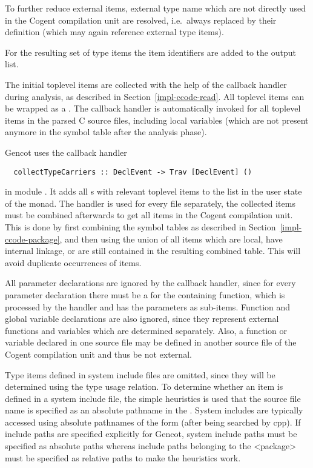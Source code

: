 To further reduce external items, external type name which are not directly used in the Cogent compilation unit are
resolved, i.e.~always replaced by their definition (which may again reference external type items).

For the resulting set of type items the item identifiers are added to the output list. 

The initial toplevel items are collected with the help of the callback handler during analysis, as described in 
Section~\ref{impl-ccode-read}. All toplevel items can be wrapped as a . The callback handler 
is automatically invoked for all toplevel items in the parsed
C source files, including local variables (which are not present anymore in the symbol table after the analysis phase).

Gencot uses the callback handler
\begin{verbatim}
  collectTypeCarriers :: DeclEvent -> Trav [DeclEvent] ()
\end{verbatim}
in module . It adds all s with relevant toplevel items to the list in the 
user state of the  monad. The handler is used for every  file separately, the collected
items must be combined afterwards to get all items in the Cogent compilation unit. This is
done by first combining the symbol tables as described in Section~\ref{impl-ccode-package}, and then using the union of all 
items which are local, have internal linkage, or are still contained in the resulting combined table. 
This will avoid duplicate occurrences of items.

All parameter declarations are ignored by the callback handler, since for every parameter declaration there must be 
a  for the containing function, which is processed by the handler and has the parameters as sub-items. 
Function and global variable declarations 
are also ignored, since they represent external functions and variables which are determined separately. Also,
a function or variable declared in one source file may be defined in another source file of the Cogent compilation unit and thus 
be not external. 

Type items defined in system include files are omitted, since they will be determined using the type usage relation. 
To determine whether
an item is defined in a system include file, the simple heuristics is used that the source file name is specified
as an absolute pathname in the . System includes are typically accessed using absolute pathnames of the 
form  (after being searched by cpp). If include paths are specified explicitly for Gencot, 
system include paths must be 
specified as absolute paths whereas include paths belonging to the <package> must be specified as relative paths
to make the heuristics work.

